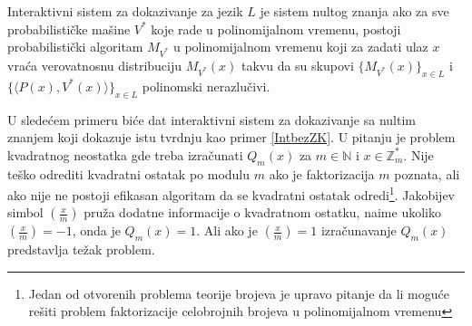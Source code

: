 \begin{definition}
	Interaktivni sistem za dokazivanje za jezik $L$ je sistem nultog znanja ako za sve probabilističke mašine $V^{*}$ koje rade u polinomijalnom vremenu, postoji probabilistički algoritam $M_{V^{*}}$ u polinomijalnom vremenu koji za zadati ulaz $x$ vraća verovatnosnu distribuciju $M_{V^{*}}(x)$ takvu da su skupovi $\{M_{V^{*}}(x)\}_{x \in L}$ i $\{\langle P(x), V^{*}(x) \rangle \}_{x \in L}$ polinomski nerazlučivi.
\end{definition}

 U sledećem primeru biće dat interaktivni sistem za dokazivanje sa nultim znanjem koji dokazuje istu tvrdnju kao primer \ref{IntbezZK}. U pitanju je problem kvadratnog neostatka gde treba izračunati $Q_{m}(x)$ za $m \in \mathbb{N}$ i $x \in \mathbb{Z}^{*}_{m}$. Nije teško odrediti kvadratni ostatak po modulu $m$ ako je faktorizacija $m$ poznata, ali ako nije ne postoji efikasan algoritam da se kvadratni ostatak odredi\footnote{Jedan od otvorenih problema teorije brojeva je upravo pitanje da li moguće rešiti problem faktorizacije celobrojnih brojeva u polinomijalnom vremenu}. Jakobijev simbol $\left ( \frac{x}{m} \right )$ pruža dodatne informacije o kvadratnom ostatku, naime ukoliko $\left ( \frac{x}{m} \right ) = -1$, onda je $Q_{m}(x) = 1$. Ali ako je $\left ( \frac{x}{m} \right ) = 1$ izračunavanje $Q_{m}(x)$ predstavlja težak problem.

